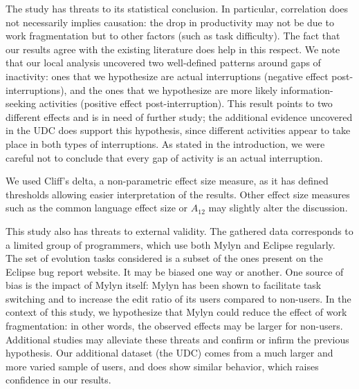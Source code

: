 \documentclass[times]{smrauth}
\begin{document}
The study has threats to its statistical conclusion. In particular, correlation does not necessarily implies causation: the drop in productivity may not be due to work fragmentation but to other factors (such as task difficulty). The fact that our results agree with the existing literature does help in this respect. We note that our local analysis uncovered two well-defined patterns around gaps of inactivity: ones that we hypothesize are actual interruptions (negative effect post-interruptions), and the ones that we hypothesize are more likely information-seeking activities (positive effect post-interruption). This result points to two different effects and is in need of further study; the additional evidence uncovered in the UDC does support this hypothesis, since different activities appear to take place in both types of interruptions. As stated in the introduction, we were careful not to conclude that every gap of activity is an actual interruption.

We used Cliff's delta, a non-parametric effect size measure, as it has defined thresholds allowing easier interpretation of the results. Other effect size measures such as the common language effect size \cite{KMW92} or $A_{12}$ \cite{RRT12} may slightly alter the discussion.

This study also has threats to external validity. The gathered data corresponds to a limited group of programmers, which use both Mylyn and Eclipse regularly. The set of evolution tasks considered is a subset of the ones present on the Eclipse bug report website. It may be biased one way or another. One source of bias is the impact of Mylyn itself: Mylyn has been shown to facilitate task switching and to increase the edit ratio of its users compared to non-users. In the context of this study, we hypothesize that Mylyn could reduce the effect of work fragmentation: in other words, the observed effects may be larger for non-users. Additional studies may alleviate these threats and confirm or infirm the previous hypothesis. Our additional dataset (the UDC) comes from a much larger and more varied sample of users, and does show similar behavior, which raises confidence in our results.

\end{document}
